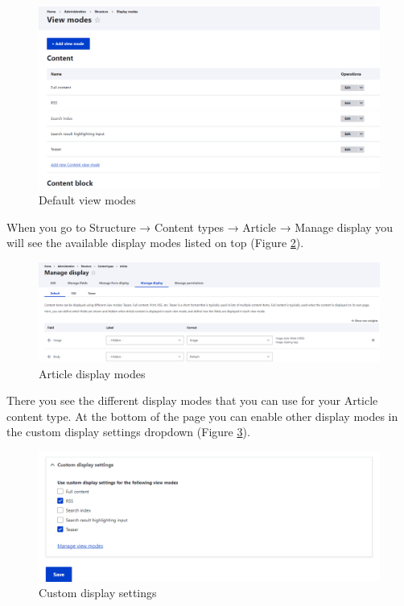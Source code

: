 \begin{figure}[H]
    \centering
    \includegraphics[width=1\linewidth]{img/ch4/structure_view_modes}
    \caption{Default view modes}
    \label{fig:structure_view_modes}
\end{figure}

When you go to Structure → Content types → Article → Manage display you will see the available display modes listed on top (Figure \ref{fig:article_display_mode}).

\begin{figure}[H]
    \centering
    \includegraphics[width=1\linewidth]{img/ch4/article_display_mode}
    \caption{Article display modes}
    \label{fig:article_display_mode}
\end{figure}

There you see the different display modes that you can use for your Article content type. At the bottom of the page you can enable other display modes in the custom display settings dropdown (Figure \ref{fig:article_custom_display}).

\begin{figure}[H]
    \centering
    \includegraphics[width=1\linewidth]{img/ch4/article_custom_display}
    \caption{Custom display settings}
    \label{fig:article_custom_display}
\end{figure}

